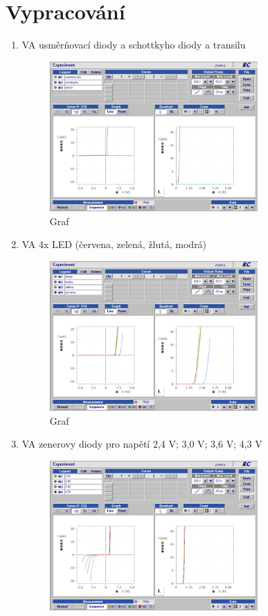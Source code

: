 \documentclass[a4paper]{article}
\begin{document}
\section*{Vypracování}
\begin{enumerate}
	\item VA usměrňovací diody a schottkyho diody a transilu
	\begin{figure}[H]
		\centering
		\includegraphics[width=0.75\textwidth]{9leden/diody1.png}
		\caption{Graf}
		\label{fig:mesh1}
	\end{figure}
	\item VA 4x LED (červena, zelená, žlutá, modrá)
	\begin{figure}[H]
		\centering
		\includegraphics[width=0.75\textwidth]{9leden/ledky.png}
		\caption{Graf }
		\label{fig:mesh2}
	\end{figure}
	\item VA zenerovy diody pro napětí  2,4 V; 3,0 V; 3,6 V; 4,3 V
	\begin{figure}[H]
		\centering
		\includegraphics[width=0.75\textwidth]{9leden/zenerovy.png}

\end{figure}
\end{enumerate}
\end{document}
